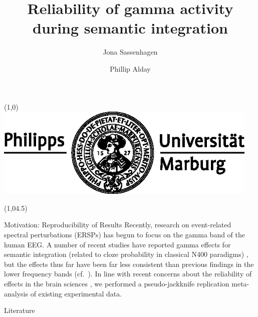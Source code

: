 \documentclass[final]{beamer}
\title{Reliability of gamma activity during semantic integration}
\author{Jona Sassenhagen \and Phillip Alday}
\institute{University of Marburg}
\date{}
\newcommand{\subblock}[1]{\bigskip\textbf{#1}}
\begin{document}
\begin{frame}{} 	
\begin{textblock}{15}(1,0)
\includegraphics[width=5in]{marburg-logo-blackwhite.eps}
\end{textblock}


\begin{textblock}{45}(1,04.5)
\begin{block}{Motivation: Reproducibility of Results}
Recently, research on event-related spectral perturbations (ERSPs) has begun to focus on the gamma band of the human EEG. A number of recent studies have reported gamma effects for semantic integration (related to cloze probability in classical N400 paradigms) \cite{mellemfriedmanmedvedev2013a,wangzhubastiaansen2012a,penolazziangrillijob2009a,hagoort2008a,hagoorthaldbastiaansen2004a}, but the effects thus far have been far less consistent than previous findings in the lower frequency bands (cf.~\cite{bastiaansenhagoort2006a,heinetammhofmann2006a,rohmklimeschhaider2001a,davidsonindefrey2007a,roehmschlesewskybornkessel2004a}).
In line with recent concerns about the reliability of effects in the brain sciences \cite{vulharriswinkielman2009a,simmonsnelsonsimonsohn2011a,kilner2013a}, we performed a pseudo-jackknife replication meta-analysis of existing experimental data. 
\end{block}

\begin{block}{Literature}
\tiny


\end{block}




\end{textblock}
\end{frame}
\end{document}
